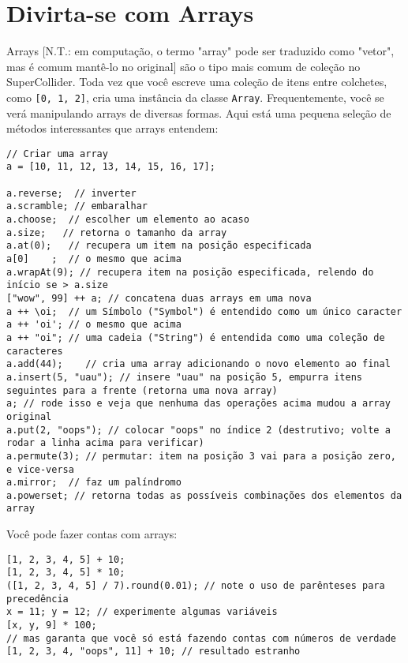 \section{Divirta-se com Arrays}
\label{sec:arrays}

Arrays [N.T.: em computação, o termo "array" pode ser traduzido como "vetor", mas é comum mantê-lo no original] são o tipo mais comum de coleção no SuperCollider. Toda vez que você escreve uma coleção de itens entre colchetes, como \texttt{[0, 1, 2]}, cria uma instância da classe \texttt{Array}. Frequentemente, você se verá manipulando arrays de diversas formas. Aqui está uma pequena seleção de métodos interessantes que arrays entendem:

 
\begin{lstlisting}[style=SuperCollider-IDE, basicstyle=\scttfamily\footnotesize]
// Criar uma array
a = [10, 11, 12, 13, 14, 15, 16, 17];

a.reverse;  // inverter
a.scramble; // embaralhar
a.choose;  // escolher um elemento ao acaso
a.size;	  // retorna o tamanho da array
a.at(0);   // recupera um item na posição especificada
a[0]	;  // o mesmo que acima
a.wrapAt(9); // recupera item na posição especificada, relendo do início se > a.size
["wow", 99] ++ a; // concatena duas arrays em uma nova
a ++ \oi;  // um Símbolo ("Symbol") é entendido como um único caracter
a ++ 'oi'; // o mesmo que acima
a ++ "oi"; // uma cadeia ("String") é entendida como uma coleção de caracteres
a.add(44);    // cria uma array adicionando o novo elemento ao final
a.insert(5, "uau"); // insere "uau" na posição 5, empurra itens seguintes para a frente (retorna uma nova array)
a; // rode isso e veja que nenhuma das operações acima mudou a array original
a.put(2, "oops"); // colocar "oops" no índice 2 (destrutivo; volte a rodar a linha acima para verificar)
a.permute(3); // permutar: item na posição 3 vai para a posição zero, e vice-versa
a.mirror;  // faz um palíndromo
a.powerset; // retorna todas as possíveis combinações dos elementos da array
\end{lstlisting}
 

Você pode fazer contas com arrays:

 
\begin{lstlisting}[style=SuperCollider-IDE, basicstyle=\scttfamily\footnotesize]
[1, 2, 3, 4, 5] + 10;
[1, 2, 3, 4, 5] * 10;
([1, 2, 3, 4, 5] / 7).round(0.01); // note o uso de parênteses para precedência
x = 11; y = 12; // experimente algumas variáveis
[x, y, 9] * 100;
// mas garanta que você só está fazendo contas com números de verdade
[1, 2, 3, 4, "oops", 11] + 10; // resultado estranho
\end{lstlisting}
 

